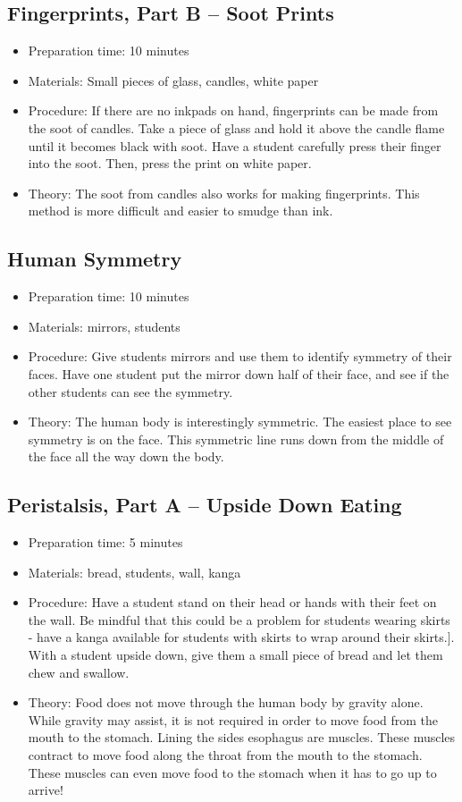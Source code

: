 \subsection{Fingerprints, Part B – Soot Prints}
\begin{itemize}
\item{Preparation time: 10 minutes}
\item{Materials: Small pieces of glass, candles, white paper}
\item{Procedure: If there are no inkpads on hand, fingerprints can be made from the soot of candles. Take a piece of glass and hold it above the candle flame until it becomes black with soot. Have a student carefully press their finger into the soot. Then, press the print on white paper.}
\item{Theory: The soot from candles also works for making fingerprints. This method is more difficult and easier to smudge than ink.}
\end{itemize}

\subsection{Human Symmetry}
\begin{itemize}
\item{Preparation time: 10 minutes}
\item{Materials: mirrors, students}
\item{Procedure: Give students mirrors and use them to identify symmetry of their faces. Have one student put the mirror down half of their face, and see if the other students can see the symmetry.}
\item{Theory: The human body is interestingly symmetric. The easiest place to see symmetry is on the face. This symmetric line runs down from the middle of the face all the way down the body.}
\end{itemize}

\subsection{Peristalsis, Part A – Upside Down Eating}
\begin{itemize}
\item{Preparation time: 5 minutes}
\item{Materials: bread, students, wall, kanga}
\item{Procedure: Have a student stand on their head or hands with their feet on the wall. Be mindful that this could be a problem for students wearing skirts - have a kanga available for students with skirts to wrap around their skirts.]. With a student upside down, give them a small piece of bread and let them chew and swallow.}
\item{Theory: Food does not move through the human body by gravity alone. While gravity may assist, it is not required in order to move food from the mouth to the stomach. Lining the sides esophagus are muscles. These muscles contract to move food along the throat from the mouth to the stomach. These muscles can even move food to the stomach when it has to go up to arrive!}
\end{itemize}


